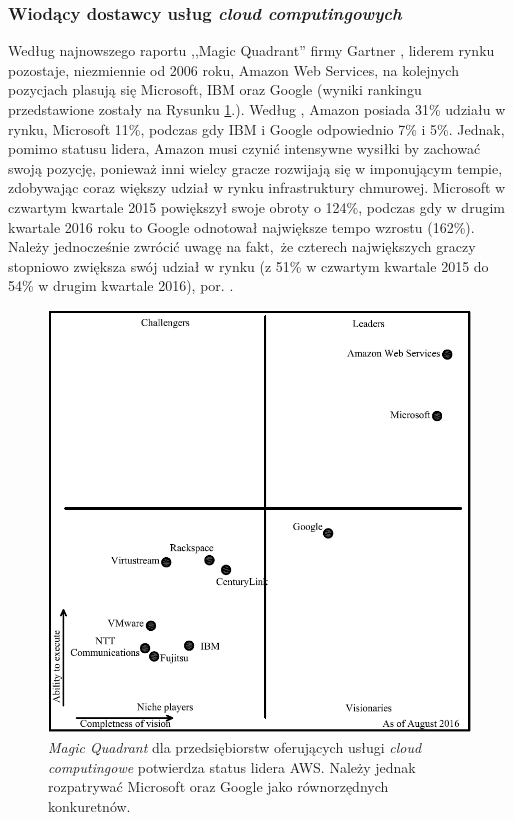\documentclass[12pt,a4paper,twoside]{article}
\begin{document}
\subsubsection{Wiodący dostawcy usług \textit{cloud computingowych}}

\noindent
Według najnowszego raportu ,,Magic Quadrant'' firmy Gartner \citep{leong2017}, liderem rynku pozostaje, niezmiennie od 2006 roku, Amazon Web Services, na kolejnych pozycjach plasują się Microsoft, IBM oraz Google (wyniki rankingu przedstawione zostały na Rysunku \ref{fig:mquad}.). Według \citet{forbes2017}, Amazon posiada 31\% udziału w rynku, Microsoft 11\%, podczas gdy IBM i Google odpowiednio 7\% i 5\%. Jednak, pomimo statusu lidera, Amazon musi czynić intensywne wysiłki by zachować swoją pozycję, ponieważ inni wielcy gracze rozwijają się w imponującym tempie, zdobywając coraz większy udział w rynku infrastruktury chmurowej. Microsoft w czwartym kwartale 2015 powiększył swoje obroty o 124\%, podczas gdy w drugim kwartale 2016 roku to Google odnotował największe tempo wzrostu (162\%). Należy jednocześnie zwrócić uwagę na fakt, że czterech największych graczy stopniowo zwiększa swój udział w rynku (z 51\% w czwartym kwartale 2015 do 54\% w drugim kwartale 2016), por. \citet{forbes2017}.

\begin{figure}[h]
  \centering
\includegraphics[scale=0.8]{../obrazy/fig:mquad.png}
\caption{\textit{Magic Quadrant} dla przedsiębiorstw oferujących usługi \textit{cloud computingowe} potwierdza status lidera AWS. Należy jednak rozpatrywać Microsoft oraz Google jako równorzędnych konkuretnów. \label{fig:mquad}}
\end{figure}
\end{document}
